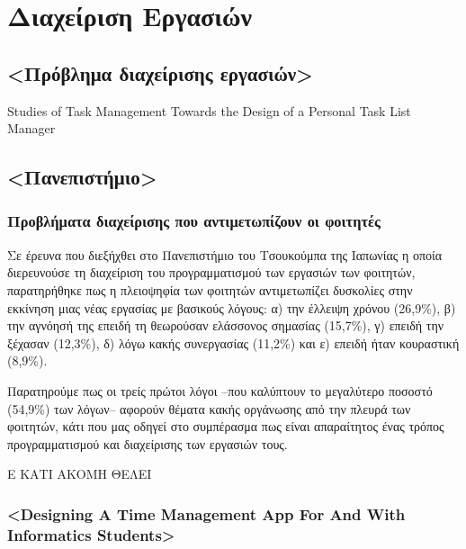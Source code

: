 \chapter{Διαχείριση Εργασιών}

    \section{<Πρόβλημα διαχείρισης εργασιών>}
        Studies of Task Management Towards the Design of a Personal Task List Manager

    \section{<Πανεπιστήμιο>}
    \subsection{Προβλήματα διαχείρισης που αντιμετωπίζουν οι φοιτητές}
        Σε έρευνα \cite{Fukuzawa2015} που διεξήχθει στο Πανεπιστήμιο του Τσουκούμπα της Ιαπωνίας η οποία διερευνούσε τη διαχείριση του προγραμματισμού των εργασιών των φοιτητών,
            παρατηρήθηκε πως η πλειοψηφία των φοιτητών αντιμετωπίζει δυσκολίες στην εκκίνηση μιας νέας εργασίας με βασικούς λόγους:
            α) την έλλειψη χρόνου (26,9\%), β) την αγνόησή της επειδή τη θεωρούσαν ελάσσονος σημασίας (15,7\%), γ) επειδή την ξέχασαν (12,3\%), δ) λόγω κακής συνεργασίας (11,2\%) και ε) επειδή ήταν κουραστική (8,9\%).

        Παρατηρούμε πως οι τρείς πρώτοι λόγοι --που καλύπτουν το μεγαλύτερο ποσοστό (54,9\%) των λόγων-- αφορούν θέματα κακής οργάνωσης από την πλευρά των φοιτητών,
            κάτι που μας οδηγεί στο συμπέρασμα πως είναι απαραίτητος ένας τρόπος προγραμματισμού και διαχείρισης των εργασιών τους.

        Ε ΚΑΤΙ ΑΚΟΜΗ ΘΕΛΕΙ

    \subsection{<Designing A Time Management App For And With Informatics Students>}
